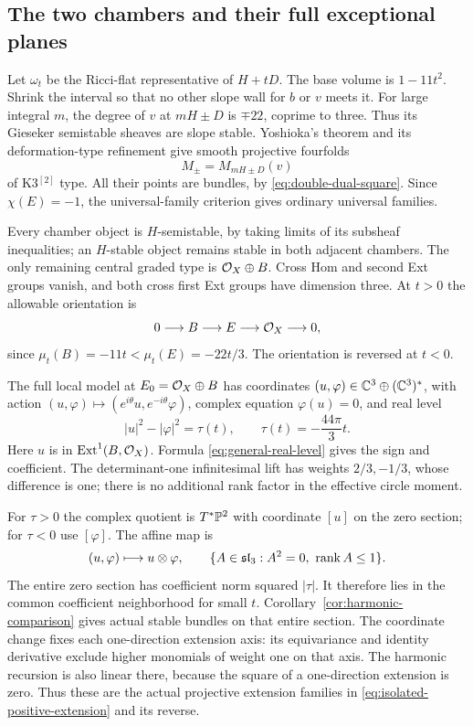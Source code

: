 \subsection{The two chambers and their full exceptional planes}
Let $\omega_t$ be the Ricci-flat representative of $H+tD$.
The base volume is $1-11t^2$. Shrink the interval so that no
other slope wall for $b$ or $v$ meets it. For large integral
$m$, the degree of $v$ at $mH\pm D$ is $\mp22$, coprime to
three. Thus its Gieseker semistable sheaves are slope stable.
Yoshioka's theorem and its deformation-type refinement
\cite[Appendix, Theorem~8.1]{yoshioka01} give smooth projective
fourfolds
\[
 M_\pm=M_{mH\pm D}(v)
\]
of K3$^{[2]}$ type. All their points are bundles, by
\eqref{eq:double-dual-square}. Since $\chi(E)=-1$, the
universal-family criterion \cite[Theorem~4.6.5]{huybrechtslehn}
gives ordinary universal families.

Every chamber object is $H$-semistable, by taking limits of its
subsheaf inequalities; an $H$-stable object remains stable in
both adjacent chambers. The only remaining central graded type
is $\mathcal O_X\oplus B$. Cross Hom and second Ext groups vanish,
and both cross first Ext groups have dimension three. At $t>0$
the allowable orientation is
\begin{equation}\label{eq:isolated-positive-extension}
 0\longrightarrow B\longrightarrow E\longrightarrow\mathcal O_X
 \longrightarrow0,
\end{equation}
since $\mu_t(B)=-11t<\mu_t(E)=-22t/3$. The orientation is
reversed at $t<0$.

The full local model at $E_0=\mathcal O_X\oplus B$ has coordinates
$(u,\varphi)\in\mathbb C^3\oplus(\mathbb C^3)^*$, with action
$(u,\varphi)\mapsto(e^{i\theta}u,e^{-i\theta}\varphi)$,
complex equation $\varphi(u)=0$, and real level
\begin{equation}\label{eq:isolated-level}
 |u|^2-|\varphi|^2=\tau(t),\qquad
 \tau(t)=-\frac{44\pi}{3}t.
\end{equation}
Here $u$ is in $\operatorname{Ext}^1(B,\mathcal O_X)$. Formula
\eqref{eq:general-real-level} gives the sign and coefficient.
The determinant-one infinitesimal lift has weights $2/3,-1/3$,
whose difference is one; there is no additional rank factor in
the effective circle moment.

For $\tau>0$ the complex quotient is $T^*\mathbb P^2$ with
coordinate $[u]$ on the zero section; for $\tau<0$ use
$[\varphi]$. The affine map is
\begin{equation}\label{eq:isolated-incidence}
 (u,\varphi)\longmapsto u\otimes\varphi,
 \qquad \{A\in\mathfrak{sl}_3:A^2=0,\ \operatorname{rank} A\le1\}.
\end{equation}
The entire zero section has coefficient norm squared $|\tau|$.
It therefore lies in the common coefficient neighborhood for
small $t$. Corollary~\ref{cor:harmonic-comparison} gives actual
stable bundles on that entire section. The coordinate change
fixes each one-direction extension axis: its equivariance and
identity derivative exclude higher monomials of weight one on
that axis. The harmonic recursion is also linear there, because
the square of a one-direction extension is zero. Thus these are
the actual projective extension families in
\eqref{eq:isolated-positive-extension} and its reverse.


